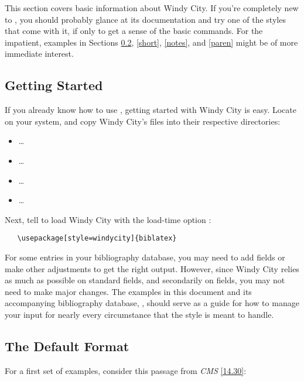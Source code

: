 \documentclass[11pt,letterpaper,oneside]{article}
\begin{document}
This section covers basic information about Windy City. If you're
completely new to \biblatex, you should probably glance at its
documentation and try one of the styles that come with it, if only to
get a sense of the basic commands. For the impatient, examples in
Sections \ref{default}, \ref{short}, \ref{notes}, and \ref{paren}
might be of more immediate interest.

\subsection{Getting Started}

If you already know how to use \biblatex, getting started with Windy
City is easy. Locate \biblatex on your system, and copy Windy City's
files into their respective directories:

\begin{itemize}[label=]
\item \ldots{}
\item \ldots{}
\item \ldots{}
\item \ldots{}
\end{itemize}

\noindent Next, tell \biblatex to load Windy City with the load-time
option :

\begin{verbatim}
   \usepackage[style=windycity]{biblatex}
\end{verbatim}

For some entries in your bibliography database, you may need to add
fields or make other adjustments to get the right output. However,
since Windy City relies as much as possible on standard \BibTeX
fields, and secondarily on \biblatex fields, you may not need to make
major changes. The examples in this document and its accompanying
bibliography database, , should serve as a guide
for how to manage your input for nearly every circumstance that the
style is meant to handle.

\subsection{The Default Format}
\label{default}

For a first set of examples, consider this passage from \textit{CMS}
\ref{14.30}:
\end{document}
